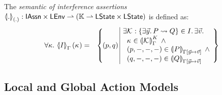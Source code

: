 \begin{definition}\label{def:interferenceSemantics}
The \emph{semantic of interference assertions}
%
$
	\semI[(.)]{.} : \IAssertions \times \LEnv \rightharpoonup \left(\Caps \rightharpoonup  \LStates \times \LStates \right)
$
%
is defined as:
%
\[
\begin{array}{r l}
	\for{\kappa} \semI[\lenv]{I}(\ca{}) =
	 	&
	 	\left\{
		\begin{array}{l | r}
			
			\hspace*{-0.2cm}(p, q)\hspace*{-0.1cm} & 
			\hspace*{-0.2cm}
			\begin{array}{l}
				\exsts{\interAss{\capAss{}}{\vec{y}}{P}{Q} \in I} \exsts{\vec{v}}\\
	
				\hspace*{0.2cm}
				\ca{} \in \semK[\lenv]{\capAss{}} \;\land\\
				
				\hspace*{0.2cm}
				(p, -, -, -) \in \intermediateSem[\lenv\text{[} \vec{y} \mapsto \vec{v} \text{]}]{P} \;\land\\
				

				
				\hspace*{0.2cm}
				(q, -, -, -) \in \intermediateSem[\lenv\text{[} \vec{y} \mapsto \vec{v} \text{]}]{Q} 
				
			\end{array}
		\end{array}
	\hspace*{-0.2cm}
	\right\}

\end{array}
\]
%
\end{definition}
%
%
\subsection{Local and Global Action Models}\label{subsec:localGlobalActionModels}
